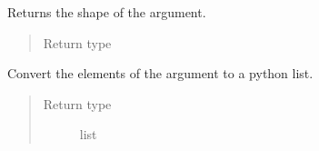 \documentclass[letterpaper,10pt,english]{sphinxmanual}
\begin{document}

\begin{fulllineitems}
\label{\detokenize{reference/py:migraphx.get_shape}}
\sphinxAtStartPar
Returns the shape of the argument.
\begin{quote}\begin{description}
\item[{Return type}] \leavevmode
\sphinxAtStartPar
{\hyperref[\detokenize{reference/py:migraphx.shape}]{}}

\end{description}\end{quote}

\end{fulllineitems}


\begin{fulllineitems}
\label{\detokenize{reference/py:migraphx.tolist}}
\sphinxAtStartPar
Convert the elements of the argument to a python list.
\begin{quote}\begin{description}
\item[{Return type}] \leavevmode
\sphinxAtStartPar
list

\end{description}\end{quote}

\end{fulllineitems}

\end{document}

